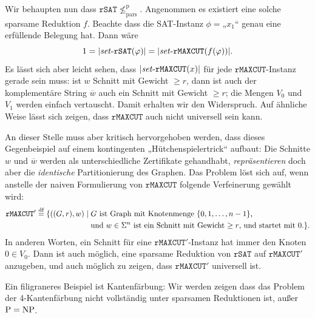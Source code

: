 Wir behaupten nun dass $\mathtt{rSAT} \not\leq_\mathrm{pars}^\mathrm p$. Angenommen es existiert eine solche sparsame Reduktion $f$. Beachte dass die SAT-Instanz $\phi={}$„$x_1$“ genau eine erfüllende Belegung hat. Dann wäre
\[ 1=|\mathit{set}\text{-}{}\mathtt{rSAT}(\varphi)|=|\mathit{set}\text{-}{}\mathtt{rMAXCUT}(f(\varphi))|. \]
Es lässt sich aber leicht sehen, dass $|\mathit{set}\text{-}{}\mathtt{rMAXCUT}(x)|$ für jede $\mathtt{rMAXCUT}$-Instanz gerade sein muss: ist $w$ Schnitt mit Gewicht $\geq r$, dann ist auch der komplementäre String $\overline{w}$ auch ein Schnitt mit Gewicht $\geq r$; die Mengen $V_0$ und $V_1$ werden einfach vertauscht.
Damit erhalten wir den Widerspruch. Auf ähnliche Weise lässt sich zeigen, dass $\mathtt{rMAXCUT}$ auch nicht universell sein kann.

An dieser Stelle muss aber kritisch hervorgehoben werden, dass dieses Gegenbeispiel auf einem kontingenten „Hütchenspielertrick“ aufbaut: Die Schnitte $w$ und $\overline{w}$ werden als unterschiedliche Zertifikate gehandhabt, \emph{repräsentieren} doch aber die \emph{identische} Partitionierung des Graphen.
Das Problem löst sich auf, wenn anstelle der naiven Formulierung von $\mathtt{rMAXCUT}$ folgende Verfeinerung gewählt wird:
\[ \begin{split} \mathtt{rMAXCUT'} \stackrel{\text{df}}{=} \{ ((G, r), w) \mid {}&\text{$G$ ist Graph mit Knotenmenge $\{0,1,\dots,n-1\}$,} \\ &\text{und $w\in\Sigma^n$ ist ein Schnitt mit Gewicht $\geq r$, und startet mit $0$.} \}.\end{split} \]
In anderen Worten, ein Schnitt für eine $\mathtt{rMAXCUT'}$-Instanz hat immer den Knoten $0\in V_0$.
Dann ist auch möglich, eine sparsame Reduktion von $\mathtt{rSAT}$ auf $\mathtt{rMAXCUT'}$ anzugeben, und auch möglich zu zeigen, dass $\mathtt{rMAXCUT'}$ universell ist.

Ein filigraneres Beispiel ist Kantenfärbung:  Wir werden zeigen dass das Problem der 4-Kantenfärbung nicht vollständig unter sparsamen Reduktionen ist, außer $\mathrm{P}=\mathrm{NP}$.


